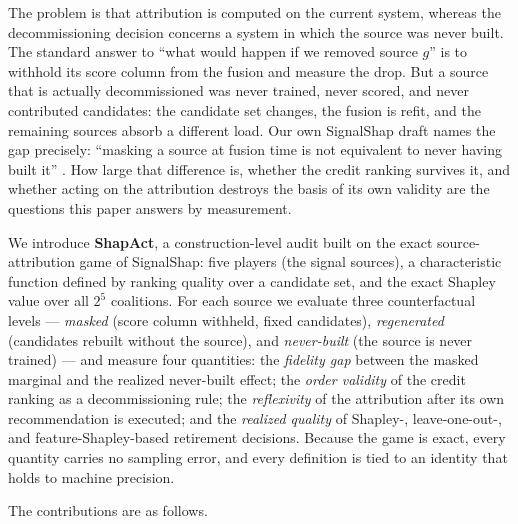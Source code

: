 \documentclass[pdflatex,sn-mathphys-num]{sn-jnl}
\theoremstyle{thmstyleone}%
\theoremstyle{thmstyletwo}%
\theoremstyle{thmstylethree}%
\begin{document}
The problem is that attribution is computed on the current system, whereas the decommissioning decision concerns a system in which the source was never built. The standard answer to ``what would happen if we removed source $g$'' is to withhold its score column from the fusion and measure the drop. But a source that is actually decommissioned was never trained, never scored, and never contributed candidates: the candidate set changes, the fusion is refit, and the remaining sources absorb a different load. Our own SignalShap draft names the gap precisely: ``masking a source at fusion time is not equivalent to never having built it'' \cite{louhichi2026signalshap}. How large that difference is, whether the credit ranking survives it, and whether acting on the attribution destroys the basis of its own validity are the questions this paper answers by measurement.

We introduce \textbf{ShapAct}, a construction-level audit built on the exact source-attribution game of SignalShap: five players (the signal sources), a characteristic function defined by ranking quality over a candidate set, and the exact Shapley value over all $2^5$ coalitions. For each source we evaluate three counterfactual levels --- \emph{masked} (score column withheld, fixed candidates), \emph{regenerated} (candidates rebuilt without the source), and \emph{never-built} (the source is never trained) --- and measure four quantities: the \emph{fidelity gap} between the masked marginal and the realized never-built effect; the \emph{order validity} of the credit ranking as a decommissioning rule; the \emph{reflexivity} of the attribution after its own recommendation is executed; and the \emph{realized quality} of Shapley-, leave-one-out-, and feature-Shapley-based retirement decisions. Because the game is exact, every quantity carries no sampling error, and every definition is tied to an identity that holds to machine precision.

The contributions are as follows.
\end{document}

